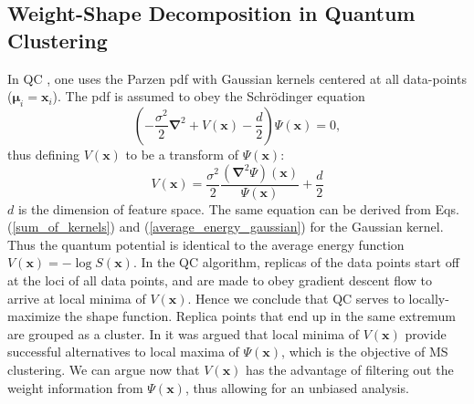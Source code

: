 \documentclass[preprint,12pt]{elsarticle}
\begin{document}
\subsection{Weight-Shape Decomposition in Quantum Clustering}
\label{qc}
In QC \cite{horn2001}, one uses the Parzen pdf with Gaussian kernels centered at all data-points ($\boldsymbol{\mu}_i=\mathbf{x}_i$). The pdf is assumed to obey the Schr{\"o}dinger equation
\begin{equation}\label{Schrodingers_equation}
  \left(-\frac{\sigma^2}{2}\boldsymbol{\nabla}^2+V\left(\mathbf{x}\right)-\frac{d}{2}\right)\Psi\left(\mathbf{x}\right)=0,
\end{equation}
thus defining $V\left(\mathbf{x}\right)$ to be a transform of $\Psi\left(\mathbf{x}\right)$:
\begin{equation}\label{Schrodingers_equation_potential}
  V\left(\mathbf{x}\right)=\frac{\sigma^2}{2}\frac{\left(\boldsymbol{\nabla}^2\Psi\right)\left(\mathbf{x}\right)}{\Psi\left(\mathbf{x}\right)}+\frac{d}{2}
\end{equation}
$d$ is the dimension of feature space. The same equation can be derived from Eqs. (\ref{sum_of_kernels}) and (\ref{average_energy_gaussian}) for the Gaussian kernel. Thus the quantum potential is identical to the average energy function $V\left(\mathbf{x}\right)=-\log S\left(\mathbf{x}\right)$. In the QC algorithm, replicas of the data points start off at the loci of all data points, and are made to obey gradient descent flow to arrive at local minima of $V\left(\mathbf{x}\right)$. Hence we conclude that QC serves to locally-maximize the shape function. Replica points that end up in the same extremum are grouped as a cluster. In \cite{horn2001} it was argued that local minima of $V\left(\mathbf{x}\right)$ provide successful alternatives to local maxima of $\Psi\left(\mathbf{x}\right)$, which is the objective of MS clustering. We can argue now that $V\left(\mathbf{x}\right)$ has the advantage of filtering out the weight information from $\Psi\left(\mathbf{x}\right)$, thus allowing for an unbiased analysis.
\end{document}
